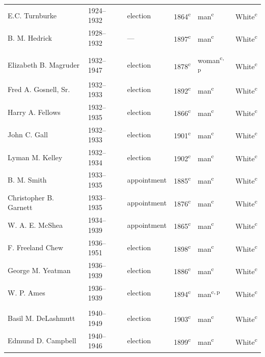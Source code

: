 \begin{longtable}{Q}
E.C. Turnburke & 1924--1932 & election & 1864\textsuperscript{c} & man\textsuperscript{c} & White\textsuperscript{c} \\*
B. M. Hedrick & 1928--1932 & --- & 1897\textsuperscript{c} & man\textsuperscript{c} & White\textsuperscript{c} \\
\addlinespace[1.4ex]
 \\*
Elizabeth B. Magruder & 1932--1947 & election & 1878\textsuperscript{c} & woman\textsuperscript{c,\,p} & White\textsuperscript{c} \\*
Fred A. Gosnell, Sr. & 1932--1933 & election & 1892\textsuperscript{c} & man\textsuperscript{c} & White\textsuperscript{c} \\
Harry A. Fellows & 1932--1935 & election & 1866\textsuperscript{c} & man\textsuperscript{c} & White\textsuperscript{c} \\
John C. Gall & 1932--1933 & election & 1901\textsuperscript{c} & man\textsuperscript{c} & White\textsuperscript{c} \\
Lyman M. Kelley & 1932--1934 & election & 1902\textsuperscript{c} & man\textsuperscript{c} & White\textsuperscript{c} \\
B. M. Smith & 1933--1935 & appointment & 1885\textsuperscript{c} & man\textsuperscript{c} & White\textsuperscript{c} \\
Christopher B. Garnett & 1933--1935 & appointment & 1876\textsuperscript{c} & man\textsuperscript{c} & White\textsuperscript{c} \\
W. A. E. McShea & 1934--1939 & appointment & 1865\textsuperscript{c} & man\textsuperscript{c} & White\textsuperscript{c} \\
F. Freeland Chew & 1936--1951 & election & 1898\textsuperscript{c} & man\textsuperscript{c} & White\textsuperscript{c} \\
George M. Yeatman & 1936--1939 & election & 1886\textsuperscript{c} & man\textsuperscript{c} & White\textsuperscript{c} \\*
W. P. Ames & 1936--1939 & election & 1894\textsuperscript{c} & man\textsuperscript{c,\,p} & White\textsuperscript{c} \\
\addlinespace[1.4ex]
 \\*
Basil M. DeLashmutt & 1940--1949 & election & 1903\textsuperscript{c} & man\textsuperscript{c} & White\textsuperscript{c} \\*
Edmund D. Campbell & 1940--1946 & election & 1899\textsuperscript{c} & man\textsuperscript{c} & White\textsuperscript{c} \\

\end{longtable}
